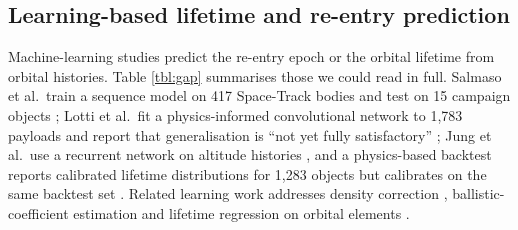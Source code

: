 \documentclass[3p,times,twocolumn]{elsarticle}
\begin{document}
\subsection{Learning-based lifetime and re-entry
prediction}\label{learning-based-lifetime-and-re-entry-prediction}

Machine-learning studies predict the re-entry epoch or the orbital
lifetime from orbital histories. Table \ref{tbl:gap} summarises those we
could read in full. Salmaso et al.~train a sequence model on 417
Space-Track bodies and test on 15 campaign objects
\citep{salmaso2023machine}; Lotti et al.~fit a physics-informed
convolutional network to 1,783 payloads and report that generalisation
is ``not yet fully satisfactory'' \citep{lotti2025exploring}; Jung et
al.~use a recurrent network on altitude histories
\citep{jung2021recurrent}, and a physics-based backtest reports
calibrated lifetime distributions for 1,283 objects but calibrates on
the same backtest set \citep{shambaugh2026validation}. Related learning
work addresses density correction \citep{licata2022machine},
ballistic-coefficient estimation \citep{andaristiyan2025ballistic} and
lifetime regression on orbital elements
\citep{li2023backpropagation, peng2020machine}.
\end{document}
